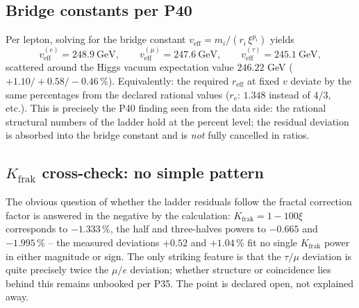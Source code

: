 \subsection{Bridge constants per P40}
Per lepton, solving for the bridge constant
$v_{\text{eff}}=m_i/(r_i\,\xi^{p_i})$ yields
\begin{equation}
  v_{\text{eff}}^{(e)} = 248.9\ \text{GeV},\qquad
  v_{\text{eff}}^{(\mu)} = 247.6\ \text{GeV},\qquad
  v_{\text{eff}}^{(\tau)} = 245.1\ \text{GeV},
\end{equation}
scattered around the Higgs vacuum expectation value $246.22$ GeV
($+1.10/+0.58/-0.46\,\%$). Equivalently: the required $r_{\text{eff}}$ at
fixed $v$ deviate by the same percentages from the declared rational values
($r_e$: $1.348$ instead of $4/3$, etc.). This is precisely the P40 finding
seen from the data side: the rational structural numbers of the ladder hold
at the percent level; the residual deviation is absorbed into the bridge
constant and is \emph{not} fully cancelled in ratios.

\subsection{$K_{\text{frak}}$ cross-check: no simple pattern}
The obvious question of whether the ladder residuals follow the fractal
correction factor is answered in the negative by the calculation:
$K_{\text{frak}}=1-100\xi$ corresponds to $-1.333\,\%$, the half and
three-halves powers to $-0.665$ and $-1.995\,\%$ -- the measured deviations
$+0.52$ and $+1.04\,\%$ fit no single $K_{\text{frak}}$ power in either
magnitude or sign. The only striking feature is that the $\tau/\mu$
deviation is quite precisely twice the $\mu/e$ deviation; whether structure
or coincidence lies behind this remains unbooked per P35. The point is
declared open, not explained away.

